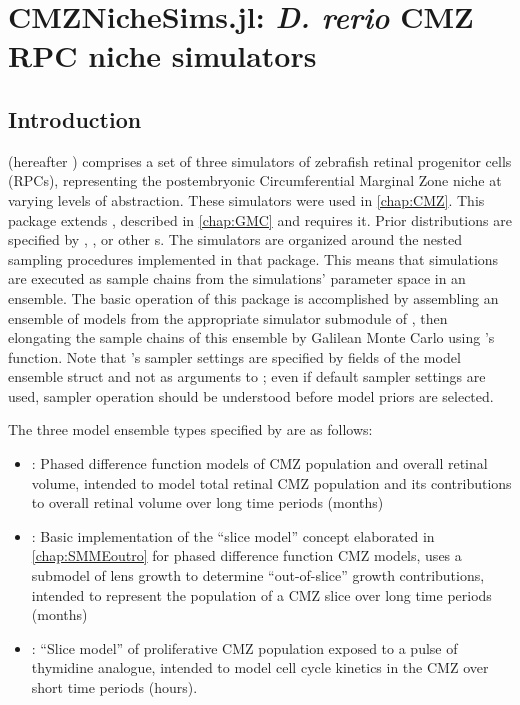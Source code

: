 \chapter{CMZNicheSims.jl: \textit{D. rerio} CMZ RPC niche simulators}
\label{chap:CNS}
\section{Introduction}
 (hereafter ) comprises a set of three simulators of zebrafish retinal progenitor cells (RPCs), representing the postembryonic Circumferential Marginal Zone niche at varying levels of abstraction. These simulators were used in \autoref{chap:CMZ}. This package extends , described in \autoref{chap:GMC} and requires it. Prior distributions are specified by , , or other s. The simulators are organized around the nested sampling procedures implemented in that package. This means that simulations are executed as sample chains from the simulations' parameter space in an ensemble. The basic operation of this package is accomplished by assembling an ensemble of models from the appropriate simulator submodule of , then elongating the sample chains of this ensemble by Galilean Monte Carlo using 's  function. Note that 's sampler settings are specified by fields of the  model ensemble struct and not as arguments to ; even if default sampler settings are used, sampler operation should be understood before model priors are selected.

The three model ensemble types specified by  are as follows:

\begin{itemize}
    \item \protect{}: Phased difference function models of CMZ population and overall retinal volume, intended to model total retinal CMZ population and its contributions to overall retinal volume over long time periods (months)
    \item \protect{}: Basic implementation of the ``slice model'' concept elaborated in \autoref{chap:SMMEoutro} for phased difference function CMZ models, uses a submodel of lens growth to determine ``out-of-slice'' growth contributions, intended to represent the population of a CMZ slice over long time periods (months)
    \item \protect{}: ``Slice model'' of proliferative CMZ population exposed to a pulse of thymidine analogue, intended to model cell cycle kinetics in the CMZ over short time periods (hours). 
\end{itemize}

